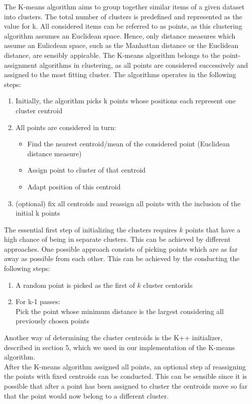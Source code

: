 The K-means algorithm aims to group together similar items of a given dataset into clusters. 
The total number of clusters is predefined and represented as the value for k. All considered items can be referred to as points, as this clustering algorithm assumes an Euclidean space. Hence, only distance measures which assume an Eulicdean space, such as the Manhattan distance or the Euclidean distance, are sensibly appicable. The K-means algorithm belongs to the point-assignment algorithms in clustering, as all points are considered successively and assigned to the most fitting cluster. The algorithms operates in the following steps:
\begin{enumerate}
	\item Initially, the algorithm picks k points whose positions each represent one cluster centroid
	\item All points are considered in turn:
	\begin{itemize}
		\item Find the nearest centroid/mean of the considered point (Euclidean distance measure)
		\item Assign point to cluster of that centroid
		\item Adapt position of this centroid
	\end{itemize}	
	
	\item (optional) fix all centroids and reassign all points with the inclusion of the initial k points
	
\end{enumerate}

The essential first step of initializing the clusters requires $k$ points that have a high chance of being in separate clusters. This can be achieved by different approaches. One possible approach consists of picking points which are as far away as possible from each other. This can be achieved by the conducting the following steps:
\begin{enumerate}
	\item	A random point is picked as the first of $k$ cluster centorids
	\item	For k-1 passes: \\
	Pick the point whose minimum distance is the largest considering all previously chosen points
	
\end{enumerate}
Another way of determining the cluster centroids is the K++ initializer, described in section 5, which we used in our implementation of the K-means algorithm.\\
After the K-means algorithm assigned all points, an optional step af reassigning the points with fixed centroids can be conducted. This can be sensible since it is possible that after a point has been assigned to cluster the centroids move so far that the point would now belong to a different cluster.
